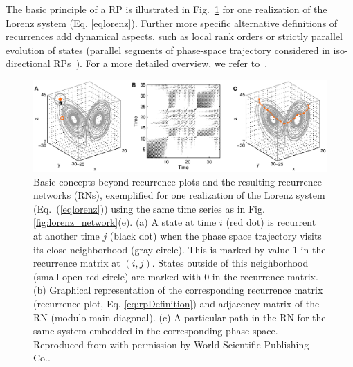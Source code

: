 The basic principle of a RP is illustrated in Fig.~\ref{lorenz_constr} for one realization of the Lorenz system (Eq. \eqref{eqlorenz}). Further more specific alternative definitions of recurrences add dynamical aspects, such as local rank orders or strictly parallel evolution of states (parallel segments of phase-space trajectory considered in iso-directional RPs~\cite{Horai2002}). For a more detailed overview, we refer to~\cite{marwan2007}.
\begin{figure}
	\centering
	\includegraphics[width=\textwidth]{Chapter03_RecurrenceNt/lorenz_constr.eps}
\caption{Basic concepts beyond recurrence plots and the resulting recurrence networks (RNs), exemplified for one realization of the Lorenz system (Eq.~(\ref{eqlorenz})) using the same time series as in Fig. \ref{fig:lorenz_network}(e). (a) A state at time $i$ (red dot) is recurrent at another time $j$ (black dot) when the phase space trajectory visits its close neighborhood (gray circle). This is marked by value 1 in the recurrence matrix at $(i,j)$. States outside of this neighborhood (small open red circle) are marked with 0 in the recurrence matrix. (b) Graphical representation of the corresponding recurrence matrix (recurrence plot, Eq. \eqref{eq:rpDefinition}) and adjacency matrix of the RN (modulo main diagonal). (c) A particular path in the RN for the same system embedded in the corresponding phase space. Reproduced from \cite{Donner2011} with permission by World Scientific Publishing Co.. }
\label{lorenz_constr}
\end{figure}

